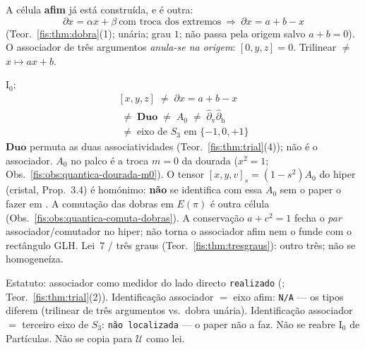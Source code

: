 \documentclass[livro.tex]{subfiles}
\begin{document}
\begin{observacao}[associador $=$ lado directo do trial, não o eixo afim]
A célula \textbf{afim} já está construída, e é outra:
\[
\boxed{\;
\partial x=\alpha x+\beta
\ \text{com troca dos extremos}
\ \Longrightarrow\
\partial x=a+b-x
\;}
\]
(Teor.~\ref{fis:thm:dobra}(1); unária; grau \(1\);
não passa pela origem salvo \(a+b=0\)).
O associador de três argumentos
\emph{anula-se na origem}:
\([0,y,z]=0\). Trilinear \(\neq\)
\(x\mapsto ax+b\).

\(\mathrm{I}_{0}\):
\[
\boxed{\;
\begin{gathered}
[x,y,z]
\;\neq\;
\partial x=a+b-x
\\
\;\neq\;
\mathbf{Duo}
\;\neq\;
A_{0}
\;\neq\;
\hat\partial_{\mathrm{v}}\hat\partial_{\mathrm{h}}
\\
\;\neq\;
\text{eixo de }S_{3}\text{ em }\{-1,0,+1\}
\end{gathered}
\;}
\]
\(\mathbf{Duo}\) permuta as duas associatividades
(Teor.~\ref{fis:thm:trial}(4)); não é o associador.
\(A_{0}\) no palco é a troca \(m=0\) da dourada
(\(x^{2}=1\); Obs.~\ref{fis:obs:quantica-dourada-m0}).
O tensor \([x,y,v]_{s}=(1-s^{2})A_{0}\) do hiper
(cristal, Prop.~3.4) é homónimo:
\textbf{não} se identifica com essa \(A_{0}\)
sem o paper o fazer em .
A comutação das dobras em \(E(\pi)\)
é outra célula
(Obs.~\ref{fis:obs:quantica-comuta-dobras}).
A conservação \(a+c^{2}=1\) fecha o
\emph{par} associador/comutador no hiper;
não torna o associador afim
nem o funde com o rectângulo GLH.
Lei~7 / três graus
(Teor.~\ref{fis:thm:tresgraus}):
outro três; não se homogeneíza.

Estatuto: associador como medidor do lado
directo \texttt{realizado}
(; Teor.~\ref{fis:thm:trial}(2)).
Identificação associador \(=\) eixo afim:
\texttt{N/A} --- os tipos diferem
(trilinear de três argumentos vs.\ dobra unária).
Identificação associador \(=\) terceiro eixo de
\(S_{3}\): \texttt{não localizada} ---
o paper não a faz.
Não se reabre \(\mathrm{I}_{0}\) de Partículas.
Não se copia para \(\mathcal{U}\) como lei.
\end{observacao}
\end{document}
